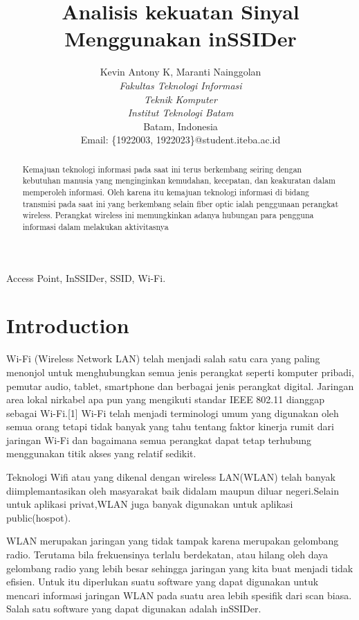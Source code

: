 \documentclass[conference]{IEEEtran}
\title{Analisis kekuatan Sinyal Menggunakan inSSIDer}
\author{Kevin Antony K\IEEEauthorrefmark{1}, Maranti Nainggolan\IEEEauthorrefmark{2}\\
\textit{Fakultas Teknologi Informasi}\\
\textit{Teknik Komputer}\\
\textit{Institut Teknologi Batam}\\
Batam, Indonesia\\
Email: \{\IEEEauthorrefmark{1}1922003, \IEEEauthorrefmark{2}1922023\}@student.iteba.ac.id}
\begin{document}
\maketitle

\begin{abstract}
    
Kemajuan teknologi informasi pada saat ini
terus berkembang seiring dengan kebutuhan manusia yang
menginginkan kemudahan, kecepatan, dan keakuratan dalam
memperoleh informasi. Oleh karena itu kemajuan teknologi
informasi di bidang transmisi pada saat ini yang berkembang
selain fiber optic ialah penggunaan perangkat wireless. Perangkat
wireless ini memungkinkan adanya hubungan para pengguna
informasi dalam melakukan aktivitasnya
\end{abstract}

\begin{IEEEkeywords}
Access Point, InSSIDer, SSID, Wi-Fi.
\end{IEEEkeywords}

\section{Introduction}
Wi-Fi (Wireless Network LAN) telah menjadi salah satu cara yang paling menonjol untuk menghubungkan 
semua jenis perangkat seperti komputer pribadi, pemutar audio, tablet, smartphone dan berbagai jenis
perangkat digital. Jaringan area lokal nirkabel apa pun yang mengikuti standar IEEE 802.11 dianggap 
sebagai Wi-Fi.[1] Wi-Fi telah menjadi terminologi umum yang digunakan oleh semua orang tetapi tidak
banyak yang tahu tentang faktor kinerja rumit dari jaringan Wi-Fi dan bagaimana semua perangkat 
dapat tetap terhubung menggunakan titik akses yang relatif sedikit.

\vspace{0.2cm}

Teknologi Wifi atau yang dikenal dengan wireless LAN(WLAN) telah banyak diimplemantasikan 
oleh masyarakat baik didalam maupun diluar negeri.Selain untuk aplikasi privat,WLAN 
juga banyak digunakan untuk aplikasi public(hospot).\

\vspace{0.2cm}

WLAN merupakan jaringan yang tidak tampak karena
merupakan gelombang radio. Terutama bila frekuensinya terlalu
berdekatan, atau hilang oleh daya gelombang radio yang
lebih besar sehingga jaringan yang kita buat menjadi tidak
efisien. Untuk itu diperlukan suatu software yang dapat digunakan
untuk mencari informasi jaringan WLAN pada suatu
area lebih spesifik dari scan biasa. Salah satu software yang
dapat digunakan adalah inSSIDer.\
\end{document}
